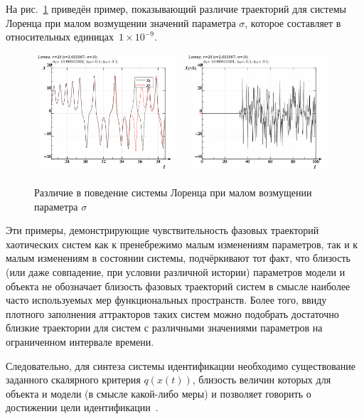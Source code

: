На рис.~\ref{atu:f:lor_diff_sigma} приведён пример, показывающий
различие траекторий для системы Лоренца
при малом возмущении значений параметра $\sigma$,
которое составляет в относительных единицах~$1 \times 10^{-9}$.

\begin{figure}[htb!]
  \centerline{
    \includegraphics[width=0.49\textwidth]{p/lor_diff-p_xx_sigma.png}
    \hfill
    \includegraphics[width=0.49\textwidth]{p/lor_diff-p_dx_sigma.png}
  }
  \caption{Различие в поведение системы Лоренца при малом возмущении параметра $\sigma$}
  \label{atu:f:lor_diff_sigma}
\end{figure}

Эти примеры, демонстрирующие чувствительность фазовых траекторий хаотических систем
как к пренебрежимо малым изменениям параметров, так и к малым изменениям
в состоянии системы, подчёркивают тот факт, что близость
(или даже совпадение, при условии различной истории) параметров модели
и объекта не обозначает близость фазовых траекторий систем
в смысле наиболее часто используемых мер функциональных пространств.
Более того, ввиду плотного заполнения аттракторов таких систем
можно подобрать достаточно близкие траектории для систем с различными значениями параметров
на ограниченном интервале времени.


Следовательно, для синтеза системы идентификации необходимо существование
заданного скалярного критерия $q(x(t))$, близость величин
которых для объекта и модели (в смысле какой-либо меры)
и позволяет говорить о достижении цели идентификации~\cite{crit_method_is}.




